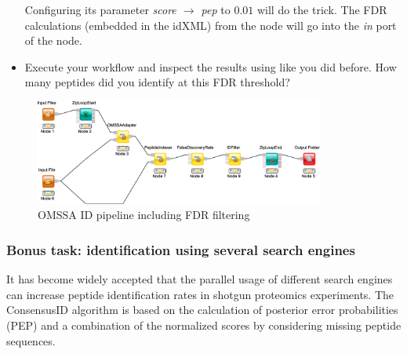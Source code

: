 \begin{itemize}
Configuring its parameter \textit{score $\rightarrow$ pep} to $0.01$ will do the trick.
The FDR calculations (embedded in the idXML) from the  node will go into the \textit{in} port of the  node.
\item
Execute your workflow and inspect the results using  like you did before.
How many peptides did you identify at this FDR threshold?
\end{itemize}

\begin{figure}[htbp]
  \centering
  \includegraphics[width=0.85\textwidth]{graphics/labelfree/fdr_peptide_identification}
  \caption{OMSSA ID pipeline including FDR filtering}
  \label{fig:id_fdr}
\end{figure}

\subsubsection{Bonus task: identification using several search engines}
It has become widely accepted that the parallel usage of different search engines can increase peptide identification rates in shotgun proteomics experiments. The ConsensusID algorithm is based on the calculation of posterior error probabilities (PEP) and a combination of the normalized scores by considering missing peptide sequences.

